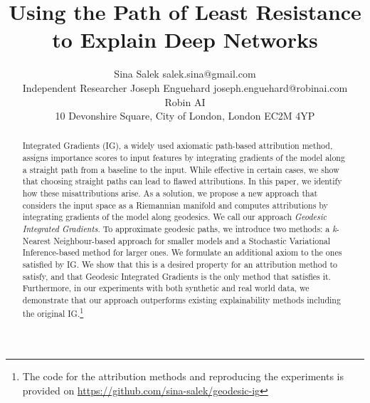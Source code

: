 \documentclass[10pt]{article} %
\title{Using the Path of Least Resistance to Explain Deep Networks}
\author{\name Sina Salek \email salek.sina@gmail.com\\
	\addr Independent Researcher
	\AND
	\name Joseph Enguehard \email joseph.enguehard@robinai.com \\
	\addr Robin AI\\ 10 Devonshire Square, City of London, London EC2M 4YP
}
\begin{document}
	
	
	\maketitle
	
	\begin{abstract}
		Integrated Gradients (IG), a widely used axiomatic path-based attribution method, assigns importance scores to input features by integrating gradients of the model along a straight path from a baseline to the input. While effective in certain cases, we show that choosing straight paths can lead to flawed attributions. In this paper, we identify how these misattributions arise. As a solution, we propose a new approach that considers the input space as a Riemannian manifold and computes attributions by integrating gradients of the model along geodesics. We call our approach \emph{Geodesic Integrated Gradients}. To approximate geodesic paths, we introduce two methods: a \emph{k}-Nearest Neighbour-based approach for smaller models and a Stochastic Variational Inference-based method for larger ones. We formulate an additional axiom to the ones satisfied by IG. We show that this is a desired property for an attribution method to satisfy, and that Geodesic Integrated Gradients is the only method that satisfies it. Furthermore, in our experiments with both synthetic and real world data, we demonstrate that our approach outperforms existing explainability methods including the original IG.\footnote{The code for the attribution methods and reproducing the experiments is provided on \href{https://github.com/sina-salek/geodesic-ig}{https://github.com/sina-salek/geodesic-ig}}
	\end{abstract}
	
	
	
	
	
	
	
	
	
	\newpage
	\appendix
	\onecolumn
	
	
\end{document}
